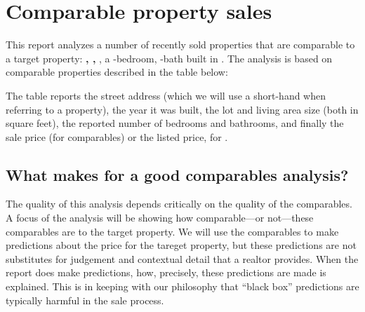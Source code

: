 \documentclass[
12pt, %
letterpaper, %
oneside, %
headinclude,footinclude, %
BCOR5mm, %
]{scrartcl}
\begin{document}


\section{Comparable property sales}
This report analyzes a number of recently sold properties that are comparable to a target property:
\textbf{\PropertyName{}, \PropertyCity{}, \PropertyState{}}, a \NumberOfBedrooms{}-bedroom, \NumberOfBaths{}-bath  \PropertyType{} built in \PropertyYearBuilt{}.
The analysis is based on \NumberOfComps{} comparable properties described in the table below:

\begin{small}

\end{small}

The table reports the street address (which we will use a short-hand when referring to a property), the year it was built, the lot and living area size (both in square feet), the reported number of bedrooms and bathrooms, and finally the sale price (for comparables) or the listed price, for \PropertyName{}. 

\subsection{What makes for a good comparables analysis?}
The quality of this analysis depends critically on the quality of the comparables.
A focus of the analysis will be showing how comparable---or not---these comparables are to the target property. 
We will use the comparables to make predictions about the price for the tareget property, but these predictions are not substitutes for judgement and contextual detail that a realtor provides.
When the report does make predictions, how, precisely, these predictions are made is explained.
This is in keeping with our philosophy that ``black box'' predictions are typically harmful in the sale process. 
\end{document}
